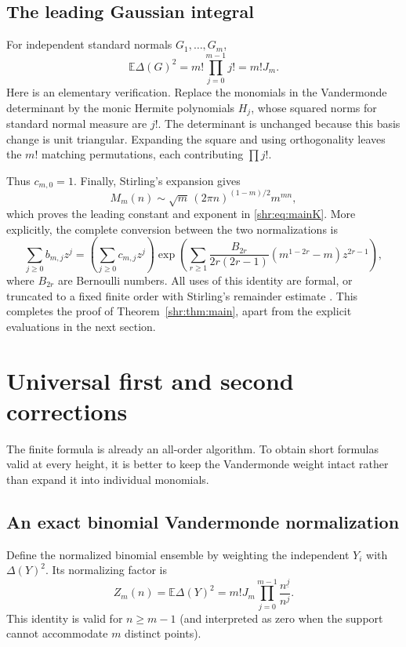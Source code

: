 \documentclass[11pt,letterpaper]{article}
\numberwithin{equation}{section}
\theoremstyle{definition}
\newcommand{\E}{\mathbb E}
\newcommand{\1}{\mathbf 1}
\newcommand{\fall}[2]{#1^{\underline{#2}}}
\begin{document}
\subsection{The leading Gaussian integral}
For independent standard normals $G_1,\ldots,G_m$,
\begin{equation}
 \E\Delta(G)^2=m!\prod_{j=0}^{m-1}j!=m!J_m.
 \label{shr:eq:gaussZ}
\end{equation}
Here is an elementary verification. Replace the monomials in the
Vandermonde determinant by the monic Hermite polynomials $H_j$, whose
squared norms for standard normal measure are $j!$. The determinant is
unchanged because this basis change is unit triangular. Expanding the
square and using orthogonality leaves the $m!$ matching permutations,
each contributing $\prod j!$.

Thus $c_{m,0}=1$. Finally, Stirling's expansion gives
\begin{equation}
 M_m(n)\sim \sqrt m\,(2\pi n)^{(1-m)/2}m^{mn},
\end{equation}
which proves the leading constant and exponent in \eqref{shr:eq:mainK}.
More explicitly, the complete conversion between the two normalizations is
\begin{equation}
 \sum_{j\ge0}b_{m,j}z^j=
 \left(\sum_{j\ge0}c_{m,j}z^j\right)
 \exp\left(\sum_{r\ge1}
 \frac{B_{2r}}{2r(2r-1)}
 (m^{1-2r}-m)z^{2r-1}\right),
 \label{shr:eq:stirling-convert}
\end{equation}
where $B_{2r}$ are Bernoulli numbers. All uses of this identity are formal,
or truncated to a fixed finite order with Stirling's remainder estimate
\cite{DLMFgamma}. This completes the proof of Theorem~\ref{shr:thm:main}, apart
from the explicit evaluations in the next section.

\section{Universal first and second corrections}

The finite formula is already an all-order algorithm. To obtain short
formulas valid at every height, it is better to keep the Vandermonde
weight intact rather than expand it into individual monomials.

\subsection{An exact binomial Vandermonde normalization}
Define the normalized binomial ensemble by weighting the independent $Y_i$
with $\Delta(Y)^2$. Its normalizing factor is
\begin{equation}
 Z_m(n)=\E\Delta(Y)^2
   =m!J_m\prod_{j=0}^{m-1}\frac{\fall n j}{n^j}.
 \label{shr:eq:binomZ}
\end{equation}
This identity is valid for $n\ge m-1$ (and interpreted as zero when the
support cannot accommodate $m$ distinct points).
\end{document}
